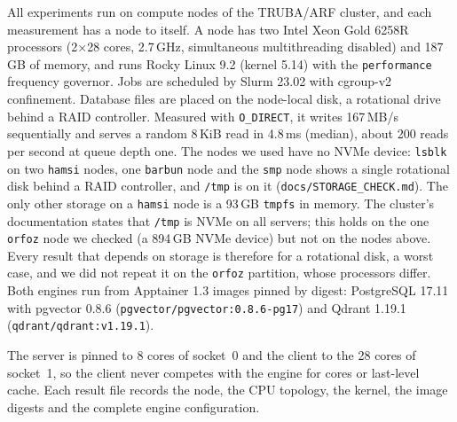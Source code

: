 \documentclass[preprint,12pt]{elsarticle}
\begin{document}
All experiments run on compute nodes of the TRUBA/ARF cluster, and each measurement has
a node to itself. A node has two Intel Xeon Gold 6258R processors (2$\times$28 cores,
2.7\,GHz, simultaneous multithreading disabled) and 187\,GB of memory, and runs Rocky
Linux 9.2 (kernel 5.14) with the \texttt{performance} frequency governor. Jobs are
scheduled by Slurm 23.02 with cgroup-v2 confinement. Database files are placed on the
node-local disk, a rotational drive behind a RAID controller. Measured with
\texttt{O\_DIRECT}, it writes 167\,MB/s sequentially and serves a random 8\,KiB read in
4.8\,ms (median), about 200 reads per second at queue depth one. The nodes we used have no NVMe device: \texttt{lsblk} on two \texttt{hamsi} nodes, one \texttt{barbun} node and the \texttt{smp} node shows a single rotational disk behind a RAID controller, and \texttt{/tmp} is on it (\texttt{docs/STORAGE\_CHECK.md}). The only other storage on a \texttt{hamsi} node is a 93\,GB \texttt{tmpfs} in memory. The cluster's documentation states that \texttt{/tmp} is NVMe on all servers; this holds on the one \texttt{orfoz} node we checked (a 894\,GB NVMe device) but not on the nodes above. Every result that depends on storage is therefore for a rotational disk, a worst case, and we did not repeat it on the \texttt{orfoz} partition, whose processors differ. Both engines run from Apptainer 1.3 images pinned by digest:
PostgreSQL 17.11 with pgvector 0.8.6 (\texttt{pgvector/pgvector:0.8.6-pg17}) and Qdrant
1.19.1 (\texttt{qdrant/qdrant:v1.19.1}).

The server is pinned to 8 cores of socket~0 and the client to the 28 cores of socket~1,
so the client never competes with the engine for cores or last-level cache. Each result
file records the node, the CPU topology, the kernel, the image digests and the complete
engine configuration.
\end{document}
